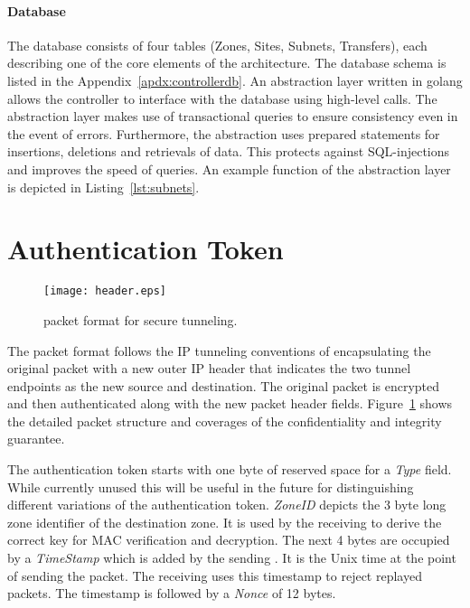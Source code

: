 \paragraph{Database}
The database consists of four tables (Zones, Sites, Subnets, Transfers), each describing one of
the core elements of the architecture.
The database schema is listed in the Appendix~\ref{apdx:controllerdb}. An abstraction layer
written in golang allows the controller to interface with the database using high-level calls.
The abstraction layer makes use of transactional queries to ensure consistency even in the event
of errors. Furthermore, the abstraction uses prepared statements for insertions, deletions and
retrievals of data. This protects against SQL-injections and improves the speed of queries.
An example function of the abstraction layer is depicted in Listing~\ref{lst:subnets}.

\section{Authentication Token}
\label{sec:token}

\begin{figure}[htb]
	\begin{center}
		\texttt{[image: header.eps]}
	\end{center}
	\caption{\name packet format for secure tunneling.}
	\label{fig:header}
\end{figure}

The \name packet format follows the IP tunneling conventions of encapsulating the original
packet with a new outer IP header that indicates the two tunnel endpoints as the new source
and destination. The original packet is encrypted and then authenticated along with the new
packet header fields. Figure~\ref{fig:header} shows the detailed packet structure and coverages
of the confidentiality and integrity guarantee.

The authentication token starts with one byte of reserved space for a \textit{Type} field. While
currently unused this will be useful in the future for distinguishing different variations of
the authentication token. \textit{ZoneID} depicts the 3 byte long zone identifier of the
destination zone. It is used by the receiving \tp to derive the correct key for MAC verification
and decryption. The next 4 bytes are occupied by a \textit{TimeStamp} which is added by the
sending \tp. It is the Unix time at the point of sending the packet. The receiving \tp uses this
timestamp to reject replayed packets. The timestamp is followed by a \textit{Nonce} of 12 bytes.

